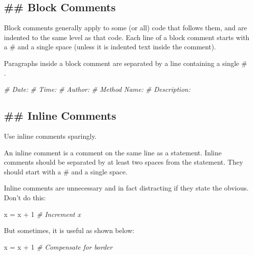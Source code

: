 \documentclass[11pt]{article}
\newenvironment{Shaded}{}{}
\newcommand{\DecValTok}[1]{\textcolor[rgb]{0.25,0.63,0.44}{{#1}}}
\newcommand{\CommentTok}[1]{\textcolor[rgb]{0.38,0.63,0.69}{\textit{{#1}}}}
\newcommand{\NormalTok}[1]{{#1}}
\newcommand{\OperatorTok}[1]{\textcolor[rgb]{0.40,0.40,0.40}{{#1}}}
\begin{document}
    \hypertarget{block-comments}{%
\subsection{\#\# Block Comments}\label{block-comments}}

Block comments generally apply to some (or all) code that follows them,
and are indented to the same level as that code. Each line of a block
comment starts with a \# and a single space (unless it is indented text
inside the comment).

Paragraphs inside a block comment are separated by a line containing a
single \# .

\begin{Shaded}
\begin{Highlighting}[]
\CommentTok{# Date: }
\CommentTok{# Time:}
\CommentTok{# Author:}
\CommentTok{# Method Name:}
\CommentTok{# Description: }
\end{Highlighting}
\end{Shaded}

\hypertarget{inline-comments}{%
\subsection{\#\# Inline Comments}\label{inline-comments}}

Use inline comments sparingly.

An inline comment is a comment on the same line as a statement. Inline
comments should be separated by at least two spaces from the statement.
They should start with a \# and a single space.

Inline comments are unnecessary and in fact distracting if they state
the obvious. Don't do this:

\begin{Shaded}
\begin{Highlighting}[]
\NormalTok{x }\OperatorTok{=}\NormalTok{ x }\OperatorTok{+} \DecValTok{1}                 \CommentTok{# Increment x}
\end{Highlighting}
\end{Shaded}

But sometimes, it is useful as shown below:

\begin{Shaded}
\begin{Highlighting}[]
\NormalTok{x }\OperatorTok{=}\NormalTok{ x }\OperatorTok{+} \DecValTok{1}                 \CommentTok{# Compensate for border}
\end{Highlighting}
\end{Shaded}
\end{document}
